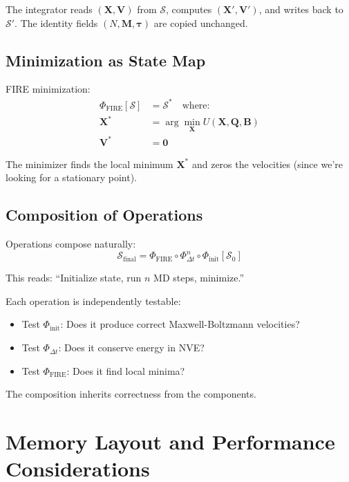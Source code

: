 \documentclass[11pt]{article}
\begin{document}
The integrator reads $(\mathbf{X}, \mathbf{V})$ from $\mathcal{S}$, computes $(\mathbf{X}', \mathbf{V}')$, and writes back to $\mathcal{S}'$. The identity fields $(N, \mathbf{M}, \boldsymbol{\tau})$ are copied unchanged.

\subsection{Minimization as State Map}

FIRE minimization:
\begin{align}
\Phi_{\text{FIRE}}[\mathcal{S}] &= \mathcal{S}^* \quad \text{where:} \\
\mathbf{X}^* &= \arg\min_{\mathbf{X}} U(\mathbf{X}, \mathbf{Q}, \mathbf{B}) \\
\mathbf{V}^* &= \mathbf{0}
\end{align}

The minimizer finds the local minimum $\mathbf{X}^*$ and zeros the velocities (since we're looking for a stationary point).

\subsection{Composition of Operations}

Operations compose naturally:
\begin{equation}
\mathcal{S}_{\text{final}} = \Phi_{\text{FIRE}} \circ \Phi_{\Delta t}^{n} \circ \Phi_{\text{init}}[\mathcal{S}_0]
\end{equation}

This reads: ``Initialize state, run $n$ MD steps, minimize.''

Each operation is independently testable:
\begin{itemize}
\item Test $\Phi_{\text{init}}$: Does it produce correct Maxwell-Boltzmann velocities?
\item Test $\Phi_{\Delta t}$: Does it conserve energy in NVE?
\item Test $\Phi_{\text{FIRE}}$: Does it find local minima?
\end{itemize}

The composition inherits correctness from the components.

\section{Memory Layout and Performance Considerations}
\end{document}
